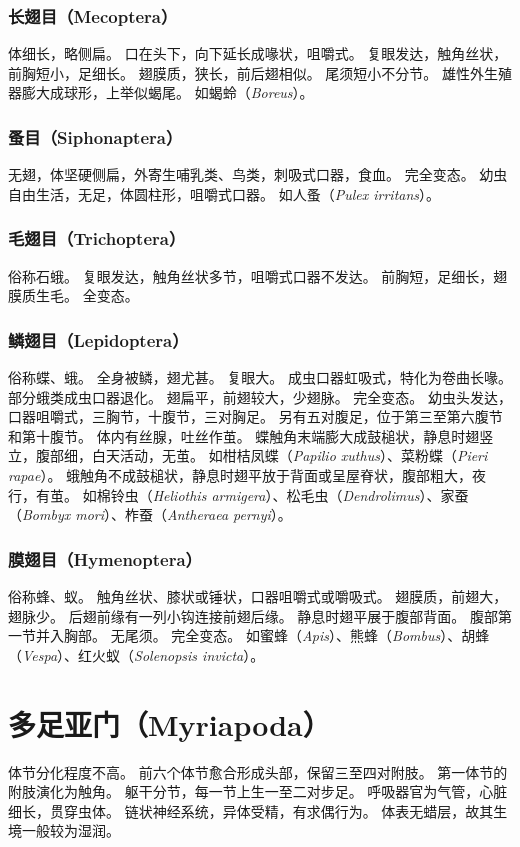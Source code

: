 \documentclass[11pt]{article}
\begin{document}
\subsubsection{长翅目（Mecoptera）}
体细长，略侧扁。
口在头下，向下延长成喙状，咀嚼式。
复眼发达，触角丝状，前胸短小，足细长。
翅膜质，狭长，前后翅相似。
尾须短小不分节。
雄性外生殖器膨大成球形，上举似蝎尾。
如蝎蛉（\textit{Boreus}）。

\subsubsection{蚤目（Siphonaptera）}
无翅，体坚硬侧扁，外寄生哺乳类、鸟类，刺吸式口器，食血。
完全变态。
幼虫自由生活，无足，体圆柱形，咀嚼式口器。
如人蚤（\textit{Pulex irritans}）。

\subsubsection{毛翅目（Trichoptera）}
俗称石蛾。
复眼发达，触角丝状多节，咀嚼式口器不发达。
前胸短，足细长，翅膜质生毛。
全变态。

\subsubsection{鳞翅目（Lepidoptera）}
俗称蝶、蛾。
全身被鳞，翅尤甚。
复眼大。
成虫口器虹吸式，特化为卷曲长喙。
部分蛾类成虫口器退化。
翅扁平，前翅较大，少翅脉。
完全变态。
幼虫头发达，口器咀嚼式，三胸节，十腹节，三对胸足。
另有五对腹足，位于第三至第六腹节和第十腹节。
体内有丝腺，吐丝作茧。
蝶触角末端膨大成鼓槌状，静息时翅竖立，腹部细，白天活动，无茧。
如柑桔凤蝶（\textit{Papilio xuthus}）、菜粉蝶（\textit{Pieri rapae}）。
蛾触角不成鼓槌状，静息时翅平放于背面或呈屋脊状，腹部粗大，夜行，有茧。
如棉铃虫（\textit{Heliothis armigera}）、松毛虫（\textit{Dendrolimus}）、家蚕（\textit{Bombyx mori}）、柞蚕（\textit{Antheraea pernyi}）。

\subsubsection{膜翅目（Hymenoptera）}
俗称蜂、蚁。
触角丝状、膝状或锤状，口器咀嚼式或嚼吸式。
翅膜质，前翅大，翅脉少。
后翅前缘有一列小钩连接前翅后缘。
静息时翅平展于腹部背面。
腹部第一节并入胸部。
无尾须。
完全变态。
如蜜蜂（\textit{Apis}）、熊蜂（\textit{Bombus}）、胡蜂（\textit{Vespa}）、红火蚁（\textit{Solenopsis invicta}）。

\section{多足亚门（Myriapoda）}
体节分化程度不高。
前六个体节愈合形成头部，保留三至四对附肢。
第一体节的附肢演化为触角。
躯干分节，每一节上生一至二对步足。
呼吸器官为气管，心脏细长，贯穿虫体。
链状神经系统，异体受精，有求偶行为。
体表无蜡层，故其生境一般较为湿润。
\end{document}
